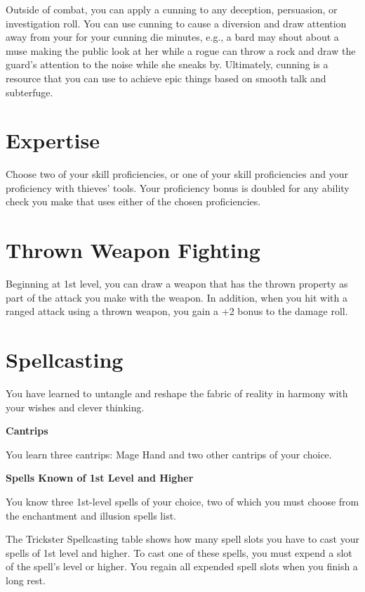\begin{multicols*}{2}
Outside of combat, you can apply a cunning to any deception, persuasion, or investigation roll. You can use cunning to cause a diversion and draw attention away from your for your cunning die minutes, e.g., a bard may shout about a muse making the public look at her while a rogue can throw a rock and draw the guard's attention to the noise while she sneaks by.
Ultimately, cunning is a resource 
that you can use to achieve epic things based on smooth talk and subterfuge. 

    
\section*{Expertise} 

Choose two of your skill proficiencies, or one of your skill proficiencies and your proficiency with thieves’ tools. Your proficiency bonus is doubled for any ability check you make that uses either of the chosen proficiencies.

\section*{Thrown Weapon Fighting}

Beginning at 1st level, you can draw a weapon that has the thrown property as part of the attack you make with the weapon.
In addition, when you hit with a ranged attack using a thrown weapon, you gain a +2 bonus to the damage roll.



\section*{Spellcasting}

You have learned to untangle and reshape the fabric of reality in harmony with your wishes and clever thinking.

\textbf{Cantrips}

You learn three cantrips: Mage Hand and two other cantrips of your choice. 


\textbf{Spells Known of 1st Level and Higher}

You know three 1st-level spells of your choice, two of which you must choose from the enchantment and illusion spells list.

The Trickster Spellcasting table shows how many spell slots you have to cast your spells of 1st level and higher. To cast one of these spells, you must expend a slot of the spell's level or higher. You regain all expended spell slots when you finish a long rest.



\end{multicols*}
